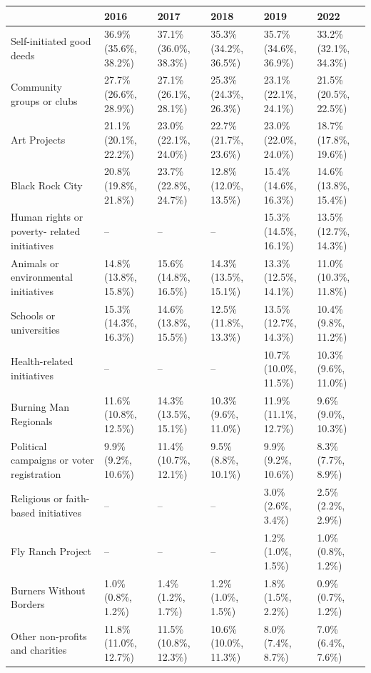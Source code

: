 \documentclass[
]{book}
\begin{document}
\begin{table}
\centering
\begin{tabular}[t]{>{}l|>{}l|>{}l|>{}l|>{}l|>{}l}
\hline
  & 2016 & 2017 & 2018 & 2019 & 2022\\
\hline
Self-initiated good deeds & 36.9\% (35.6\%, 38.2\%) & 37.1\% (36.0\%, 38.3\%) & 35.3\% (34.2\%, 36.5\%) & 35.7\% (34.6\%, 36.9\%) & 33.2\% (32.1\%, 34.3\%)\\
\hline
Community groups or clubs & 27.7\% (26.6\%, 28.9\%) & 27.1\% (26.1\%, 28.1\%) & 25.3\% (24.3\%, 26.3\%) & 23.1\% (22.1\%, 24.1\%) & 21.5\% (20.5\%, 22.5\%)\\
\hline
Art Projects & 21.1\% (20.1\%, 22.2\%) & 23.0\% (22.1\%, 24.0\%) & 22.7\% (21.7\%, 23.6\%) & 23.0\% (22.0\%, 24.0\%) & 18.7\% (17.8\%, 19.6\%)\\
\hline
Black Rock City & 20.8\% (19.8\%, 21.8\%) & 23.7\% (22.8\%, 24.7\%) & 12.8\% (12.0\%, 13.5\%) & 15.4\% (14.6\%, 16.3\%) & 14.6\% (13.8\%, 15.4\%)\\
\hline
Human rights or poverty-
 related initiatives & -- & -- & -- & 15.3\% (14.5\%, 16.1\%) & 13.5\% (12.7\%, 14.3\%)\\
\hline
Animals or environmental 
 initiatives & 14.8\% (13.8\%, 15.8\%) & 15.6\% (14.8\%, 16.5\%) & 14.3\% (13.5\%, 15.1\%) & 13.3\% (12.5\%, 14.1\%) & 11.0\% (10.3\%, 11.8\%)\\
\hline
Schools or universities & 15.3\% (14.3\%, 16.3\%) & 14.6\% (13.8\%, 15.5\%) & 12.5\% (11.8\%, 13.3\%) & 13.5\% (12.7\%, 14.3\%) & 10.4\% (9.8\%, 11.2\%)\\
\hline
Health-related initiatives & -- & -- & -- & 10.7\% (10.0\%, 11.5\%) & 10.3\% (9.6\%, 11.0\%)\\
\hline
Burning Man Regionals & 11.6\% (10.8\%, 12.5\%) & 14.3\% (13.5\%, 15.1\%) & 10.3\% (9.6\%, 11.0\%) & 11.9\% (11.1\%, 12.7\%) & 9.6\% (9.0\%, 10.3\%)\\
\hline
Political campaigns or 
 voter registration & 9.9\% (9.2\%, 10.6\%) & 11.4\% (10.7\%, 12.1\%) & 9.5\% (8.8\%, 10.1\%) & 9.9\% (9.2\%, 10.6\%) & 8.3\% (7.7\%, 8.9\%)\\
\hline
Religious or faith-based 
 initiatives & -- & -- & -- & 3.0\% (2.6\%, 3.4\%) & 2.5\% (2.2\%, 2.9\%)\\
\hline
Fly Ranch Project & -- & -- & -- & 1.2\% (1.0\%, 1.5\%) & 1.0\% (0.8\%, 1.2\%)\\
\hline
Burners Without Borders & 1.0\% (0.8\%, 1.2\%) & 1.4\% (1.2\%, 1.7\%) & 1.2\% (1.0\%, 1.5\%) & 1.8\% (1.5\%, 2.2\%) & 0.9\% (0.7\%, 1.2\%)\\
\hline
Other non-profits and 
 charities & 11.8\% (11.0\%, 12.7\%) & 11.5\% (10.8\%, 12.3\%) & 10.6\% (10.0\%, 11.3\%) & 8.0\% (7.4\%, 8.7\%) & 7.0\% (6.4\%, 7.6\%)\\
\hline
\end{tabular}
\end{table}
\end{document}
